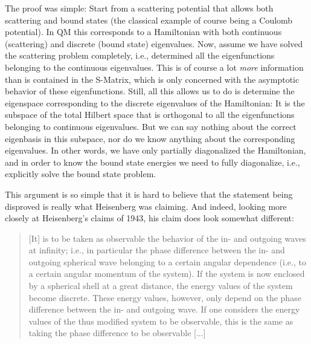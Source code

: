 \documentclass[12pt,a4paper]{article}
\begin{document}
The proof was simple: Start from a scattering potential that allows both scattering and bound states (the classical example of course being a Coulomb potential). In QM this corresponds to a Hamiltonian with both continuous (scattering) and discrete (bound state) eigenvalues. Now, assume we have solved the scattering problem completely, i.e., determined all the eigenfunctions belonging to the continuous eigenvalues. This is of course a lot \emph{more} information than is contained in the S-Matrix, which is only concerned with the asymptotic behavior of these eigenfunctions. Still, all  this allows us to do is determine the eigenspace corresponding to the discrete eigenvalues of the Hamiltonian: It is the subspace of the total Hilbert space that is orthogonal to all the eigenfunctions belonging to continuous eigenvalues. But we can say nothing about the correct eigenbasis in this subspace, nor do we know anything about the corresponding eigenvalues. In other words, we have only partially diagonalized the Hamiltonian, and in order to know the bound state energies we need to fully diagonalize, i.e., explicitly solve the bound state problem. 

This argument is so simple that it is hard to believe that the statement being disproved is really what Heisenberg was claiming. And indeed, looking more closely at Heisenberg's claims of 1943, his claim does look somewhat different:

\begin{quote}
[It] is to be taken as observable the behavior of the in- and outgoing waves at infinity; i.e., in particular the phase difference between the in- and outgoing spherical wave belonging to a certain angular dependence (i.e., to a certain angular momentum of the system). If the system is now enclosed by a spherical shell at a great distance, the energy values of the system become discrete. These energy values, however, only depend on the phase difference between the in- and outgoing wave. If one considers the energy values of the thus modified system to be observable, this is the same as taking the phase difference to be observable [...]
\end{quote}
\end{document}
